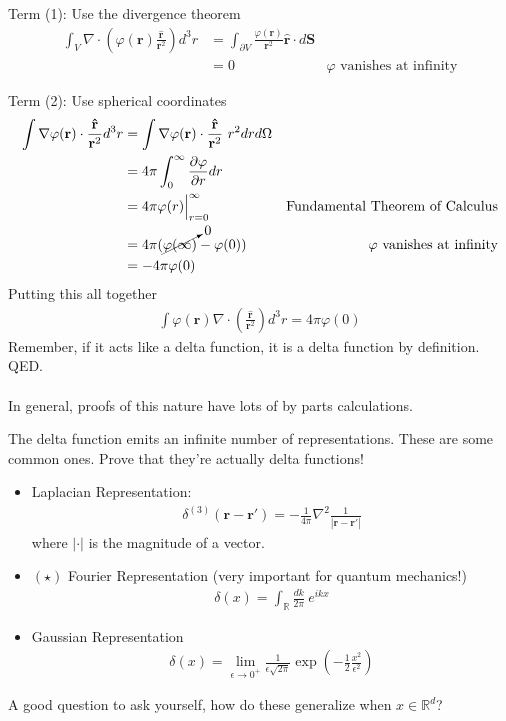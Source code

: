 \documentclass[12pt,fleqn]{article}
\numberwithin{equation}{section} %
\newcounter{problem}
\begin{document}
Term (1): Use the divergence theorem
\begin{align}
	\int_V \nabla\cdot \left(\varphi(\mathbf r) \frac{\mathbf{\hat{r}}}{\mathbf r^2} \right) d^3r & = \int_{\partial V} \frac{\varphi(\mathbf r)}{\mathbf r^2}  \mathbf{\hat r} \cdot d\mathbf S \\
	& = 0 & \varphi \text{ vanishes at infinity}
\end{align}

Term (2): Use spherical coordinates
\begin{align}
	\int \nabla\varphi(\mathbf r) \cdot \frac{\mathbf{\hat{r}}}{\mathbf r^2} d^3r & = \int \nabla \varphi(\mathbf r) \cdot \frac{\mathbf{\hat{r}}}{\mathbf r^2} ~r^2 dr   d \Omega \\
	&= 4\pi   \int_0^\infty \frac{\partial \varphi}{\partial r}  dr \\
	& = 4\pi \varphi(r) \Big|_{r=0}^\infty & \text{Fundamental Theorem of Calculus}\\
	&  = 4\pi ( \cancelto{0}{\varphi(\infty)} - \varphi(0)) & \varphi \text{ vanishes at infinity}\\
	& = -4\pi \varphi(0)
\end{align}
Putting this all together
\begin{align}
	\int \varphi(\mathbf r) \nabla \cdot \left( \frac{\mathbf{\hat{r}}}{\mathbf r^2} \right) d^3 r = 4\pi \varphi(0)
\end{align}
Remember, if it acts like a delta function, it is a delta function by definition. QED.\\
\\
In general, proofs of this nature have lots of by parts calculations.
\begin{problem} The delta function emits an infinite number of representations. These are some common ones. Prove that they're actually delta functions!
	\begin{itemize}
		\item Laplacian Representation:
		\begin{align}
			\delta^{(3)} (\mathbf r - \mathbf r') = - \frac{1}{4\pi} \nabla^2 \frac{1}{|\mathbf r - \mathbf r'|}
		\end{align}
		where $|\cdot |$ is the magnitude of a vector.
		\item $(\star)$ Fourier Representation (very important for quantum mechanics!)
		\begin{align}
			\delta(x) = \int_{\mathbb R} \frac{d k}{2\pi} ~ e^{i k x}
		\end{align}
		
		\item Gaussian Representation
		\begin{align}
			\delta(x) = \lim_{\epsilon \to 0^+}  \frac{1}{\epsilon \sqrt{2\pi}} \exp \left(-\frac{1}{2} \frac{x^2}{\epsilon^2} \right)
		\end{align}
	\end{itemize}
	A good question to ask yourself, how do these generalize when $x \in \mathbb R^d$?
\end{problem}
\end{document}
